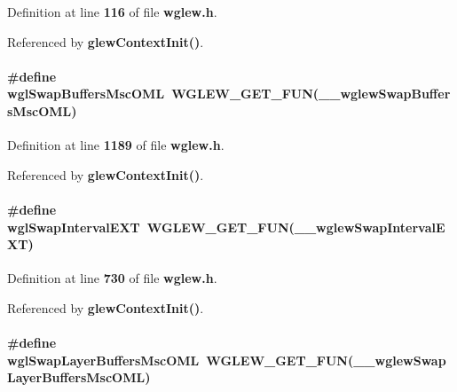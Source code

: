 Definition at line {\bf 116} of file {\bf wglew.\+h}.



Referenced by {\bf glew\+Context\+Init()}.

\paragraph[{wgl\+Swap\+Buffers\+Msc\+O\+ML}]{\setlength{\rightskip}{0pt plus 5cm}\#define wgl\+Swap\+Buffers\+Msc\+O\+ML~{\bf W\+G\+L\+E\+W\+\_\+\+G\+E\+T\+\_\+\+F\+UN}({\bf \+\_\+\+\_\+wglew\+Swap\+Buffers\+Msc\+O\+ML})}\label{wglew_8h_a33e085307827d7f09ac3d7b0ddb26acf}


Definition at line {\bf 1189} of file {\bf wglew.\+h}.



Referenced by {\bf glew\+Context\+Init()}.

\paragraph[{wgl\+Swap\+Interval\+E\+XT}]{\setlength{\rightskip}{0pt plus 5cm}\#define wgl\+Swap\+Interval\+E\+XT~{\bf W\+G\+L\+E\+W\+\_\+\+G\+E\+T\+\_\+\+F\+UN}({\bf \+\_\+\+\_\+wglew\+Swap\+Interval\+E\+XT})}\label{wglew_8h_a8a2877f5187c2bbcaab779c518e4bb1a}


Definition at line {\bf 730} of file {\bf wglew.\+h}.



Referenced by {\bf glew\+Context\+Init()}.

\paragraph[{wgl\+Swap\+Layer\+Buffers\+Msc\+O\+ML}]{\setlength{\rightskip}{0pt plus 5cm}\#define wgl\+Swap\+Layer\+Buffers\+Msc\+O\+ML~{\bf W\+G\+L\+E\+W\+\_\+\+G\+E\+T\+\_\+\+F\+UN}({\bf \+\_\+\+\_\+wglew\+Swap\+Layer\+Buffers\+Msc\+O\+ML})}\label{wglew_8h_a16425d3173d1ed6dea6a1547c1afa9c1}


